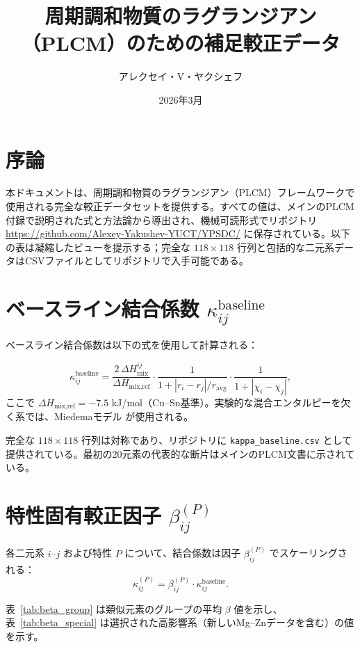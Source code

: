 \documentclass[12pt,a4paper]{article}
\title{周期調和物質のラグランジアン（PLCM）のための補足較正データ}
\author{アレクセイ・V・ヤクシェフ}
\date{2026年3月}
\begin{document}
	\maketitle
	
	\tableofcontents
	\newpage
	
	\section{序論}
	本ドキュメントは、周期調和物質のラグランジアン（PLCM）フレームワークで使用される完全な較正データセットを提供する。すべての値は、メインのPLCM付録で説明された式と方法論から導出され、機械可読形式でリポジトリ \url{https://github.com/Alexey-Yakushev-YUCT/YPSDC/} に保存されている。以下の表は凝縮したビューを提示する；完全な $118\times118$ 行列と包括的な二元系データはCSVファイルとしてリポジトリで入手可能である。
	
	\section{ベースライン結合係数 $\kappa_{ij}^{\text{baseline}}$}
	ベースライン結合係数は以下の式を使用して計算される：
	
	\[
	\kappa_{ij}^{\text{baseline}} = \frac{2\,\Delta H_{\text{mix}}^{ij}}{\Delta H_{\text{mix,ref}}} \cdot
	\frac{1}{1 + |r_i - r_j|/r_{\text{avg}}} \cdot
	\frac{1}{1 + |\chi_i - \chi_j|},
	\]
	ここで $\Delta H_{\text{mix,ref}} = -7.5$ kJ/mol（Cu–Sn基準）。実験的な混合エンタルピーを欠く系では、Miedemaモデル \cite{Miedema1980} が使用される。
	
	完全な $118\times118$ 行列は対称であり、リポジトリに \texttt{kappa\_baseline.csv} として提供されている。最初の20元素の代表的な断片はメインのPLCM文書に示されている。
	
	\section{特性固有較正因子 $\beta_{ij}^{(P)}$}
	各二元系 $i$–$j$ および特性 $P$ について、結合係数は因子 $\beta_{ij}^{(P)}$ でスケーリングされる：
	\[
	\kappa_{ij}^{(P)} = \beta_{ij}^{(P)} \cdot \kappa_{ij}^{\text{baseline}}.
	\]
	
	表~\ref{tab:beta_group} は類似元素のグループの平均 $\beta$ 値を示し、表~\ref{tab:beta_special} は選択された高影響系（新しいMg–Znデータを含む）の値を示す。
	
\end{document}
